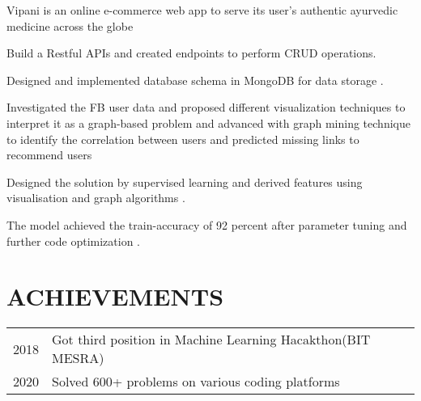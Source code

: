 \documentclass[]{deedy-resume-openfont}
\begin{document}
\begin{minipage}[t]{0.66\textwidth}
Vipani is an online e-commerce web app to serve its user’s authentic ayurvedic
medicine across the globe
\begin{tightemize}
\item Build a Restful APIs and created endpoints to perform CRUD operations.
\item Designed and implemented database schema in MongoDB for data storage .
\end{tightemize}
\sectionsep



Investigated the FB user data and proposed different visualization techniques to
interpret it as a graph-based problem and advanced with graph mining technique to
identify the correlation between users and predicted missing links to recommend
users
\begin{tightemize}
\item Designed the solution by supervised learning and derived features using
visualisation and graph algorithms .
\item The model achieved the train-accuracy of 92 percent after parameter tuning
and further code optimization .
\end{tightemize}
\sectionsep



\section{ACHIEVEMENTS} 
\begin{tabular}{rll}
2018	    & Got third position in Machine Learning Hacakthon(BIT MESRA)\\
2020        &Solved 600+ problems on various coding platforms
\end{tabular}
\sectionsep



\end{minipage} 
\end{document}
